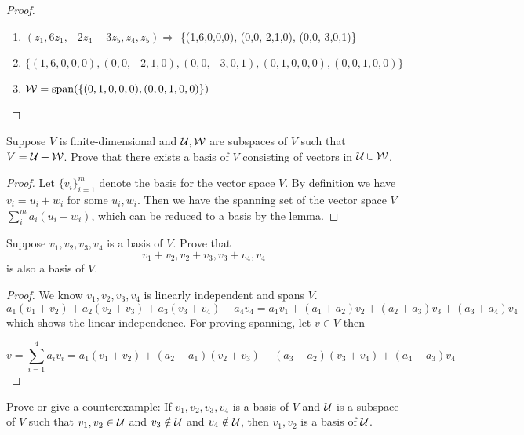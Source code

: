 \documentclass{extarticle}
\begin{document}
\begin{proof}
\begin{enumerate}
    \item  \((z_1, 6z_1, -2z_4 - 3 z_5, z_4, z_5) \Rightarrow\)   \{(1,6,0,0,0), (0,0,-2,1,0), (0,0,-3,0,1)\}
    \item \(\{(1,6,0,0,0), (0,0,-2,1,0), (0,0,-3,0,1), (0,1,0,0,0), (0,0,1,0,0)\}\)
    \item \(\mathcal{W} = \text{span}(\{(0,1,0,0,0), (0,0,1,0,0)\})\)
\end{enumerate}
\end{proof}

\begin{problem}{5}
Suppose \(V\) is finite-dimensional and \(\mathcal{U}, \mathcal{W}\) are subspaces of \(V\) such that \(V = \mathcal{U}
+ \mathcal{W}\). Prove that there exists a basis of \(V\) consisting of vectors in \(\mathcal{U} \cup \mathcal{W}\).    
\end{problem}

\begin{proof}
Let \(\{v_i\}_{i=1}^m\) denote the basis for the vector space \(V\). By definition we have 
\(v_i = u_i + w_i\) for some \(u_i, w_i\). Then we have the spanning set of the vector space \(V\)
\(\sum_i^m a_i (u_i + w_i)\), which can be reduced to a basis by the lemma.
\end{proof}


\begin{problem}{7}
    Suppose \(v_1, v_2, v_3, v_4\) is a basis of \(V\). Prove that 
    \[v_1 + v_2, v_2 + v_3, v_3+v_4, v_4\]
    is also a basis of \(V\). 
\end{problem}

\begin{proof}
We know \(v_1, v_2, v_3, v_4\) is linearly independent and spans \(V\). 
\[a_1(v_1 + v_2) + a_2 (v_2 + v_3) + a_3 (v_3 + v_4) + a_4 v_4 = a_1 v_1 
+ (a_1 + a_2) v_2 + (a_2 + a_3)v_3 + (a_3 + a_4)v_4\]
which shows the linear independence. For proving spanning, let \(v \in V\) then 

\[v = \sum_{i=1}^4 a_i v_i = a_1(v_1 + v_2) + (a_2 - a_1)(v_2 + v_3)
+ (a_3 - a_2)(v_3 + v_4) + (a_4 - a_3)v_4\]
\end{proof}


\begin{problem}{8}
    Prove or give a counterexample: If \(v_1, v_2, v_3, v_4\) is a basis of \(V\) and 
    \(\mathcal{U}\) is a subspace of \(V\) such that \(v_1, v_2 \in \mathcal{U}\) and \(v_3 \notin \mathcal{U}\)
    and \(v_4 \notin \mathcal{U}\), then \(v_1, v_2\) is a basis of \(\mathcal{U}\). 
\end{problem}
\end{document}
